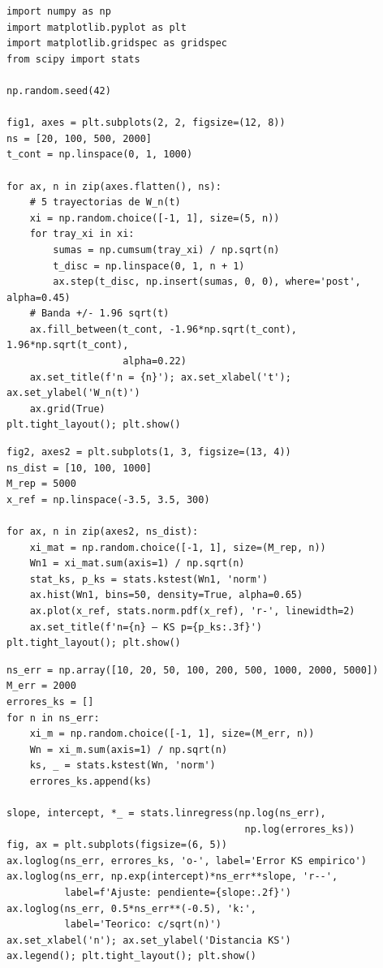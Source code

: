 \documentclass[12pt, a4paper]{article}
\begin{document}
\begin{lstlisting}[style=python, caption={Figura 1: Random walk reescalado para $n \in \{20,100,500,2000\}$.}]
import numpy as np
import matplotlib.pyplot as plt
import matplotlib.gridspec as gridspec
from scipy import stats

np.random.seed(42)

fig1, axes = plt.subplots(2, 2, figsize=(12, 8))
ns = [20, 100, 500, 2000]
t_cont = np.linspace(0, 1, 1000)

for ax, n in zip(axes.flatten(), ns):
    # 5 trayectorias de W_n(t)
    xi = np.random.choice([-1, 1], size=(5, n))
    for tray_xi in xi:
        sumas = np.cumsum(tray_xi) / np.sqrt(n)
        t_disc = np.linspace(0, 1, n + 1)
        ax.step(t_disc, np.insert(sumas, 0, 0), where='post', alpha=0.45)
    # Banda +/- 1.96 sqrt(t)
    ax.fill_between(t_cont, -1.96*np.sqrt(t_cont), 1.96*np.sqrt(t_cont),
                    alpha=0.22)
    ax.set_title(f'n = {n}'); ax.set_xlabel('t'); ax.set_ylabel('W_n(t)')
    ax.grid(True)
plt.tight_layout(); plt.show()
\end{lstlisting}

\begin{lstlisting}[style=python, caption={Figura 2: Convergencia de $W_n(1)$ a $\mathcal{N}(0,1)$.}]
fig2, axes2 = plt.subplots(1, 3, figsize=(13, 4))
ns_dist = [10, 100, 1000]
M_rep = 5000
x_ref = np.linspace(-3.5, 3.5, 300)

for ax, n in zip(axes2, ns_dist):
    xi_mat = np.random.choice([-1, 1], size=(M_rep, n))
    Wn1 = xi_mat.sum(axis=1) / np.sqrt(n)
    stat_ks, p_ks = stats.kstest(Wn1, 'norm')
    ax.hist(Wn1, bins=50, density=True, alpha=0.65)
    ax.plot(x_ref, stats.norm.pdf(x_ref), 'r-', linewidth=2)
    ax.set_title(f'n={n} — KS p={p_ks:.3f}')
plt.tight_layout(); plt.show()
\end{lstlisting}

\begin{lstlisting}[style=python, caption={Figura 3: Tasa de convergencia $n^{-1/2}$ — error KS vs $n$.}]
ns_err = np.array([10, 20, 50, 100, 200, 500, 1000, 2000, 5000])
M_err = 2000
errores_ks = []
for n in ns_err:
    xi_m = np.random.choice([-1, 1], size=(M_err, n))
    Wn = xi_m.sum(axis=1) / np.sqrt(n)
    ks, _ = stats.kstest(Wn, 'norm')
    errores_ks.append(ks)

slope, intercept, *_ = stats.linregress(np.log(ns_err),
                                         np.log(errores_ks))
fig, ax = plt.subplots(figsize=(6, 5))
ax.loglog(ns_err, errores_ks, 'o-', label='Error KS empirico')
ax.loglog(ns_err, np.exp(intercept)*ns_err**slope, 'r--',
          label=f'Ajuste: pendiente={slope:.2f}')
ax.loglog(ns_err, 0.5*ns_err**(-0.5), 'k:',
          label='Teorico: c/sqrt(n)')
ax.set_xlabel('n'); ax.set_ylabel('Distancia KS')
ax.legend(); plt.tight_layout(); plt.show()
\end{lstlisting}
\end{document}
